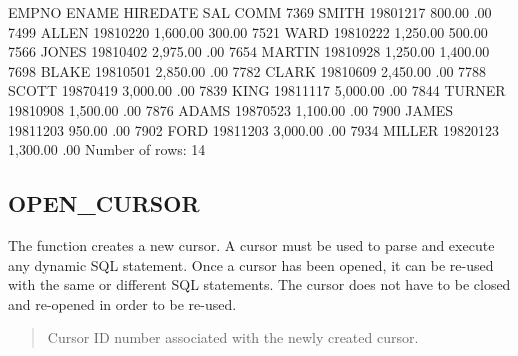 \documentclass[letterpaper,10pt,english,openany,oneside]{sphinxmanual}
\begin{document}
\begin{sphinxVerbatim}[commandchars=\\\{\}]
EMPNO  ENAME       HIREDATE    SAL       COMM
\PYGZhy{}\PYGZhy{}\PYGZhy{}\PYGZhy{}\PYGZhy{}  \PYGZhy{}\PYGZhy{}\PYGZhy{}\PYGZhy{}\PYGZhy{}\PYGZhy{}\PYGZhy{}\PYGZhy{}\PYGZhy{}\PYGZhy{}  \PYGZhy{}\PYGZhy{}\PYGZhy{}\PYGZhy{}\PYGZhy{}\PYGZhy{}\PYGZhy{}\PYGZhy{}\PYGZhy{}\PYGZhy{}  \PYGZhy{}\PYGZhy{}\PYGZhy{}\PYGZhy{}\PYGZhy{}\PYGZhy{}\PYGZhy{}\PYGZhy{}  \PYGZhy{}\PYGZhy{}\PYGZhy{}\PYGZhy{}\PYGZhy{}\PYGZhy{}\PYGZhy{}\PYGZhy{}
7369   SMITH       1980\PYGZhy{}12\PYGZhy{}17    800.00       .00
7499   ALLEN       1981\PYGZhy{}02\PYGZhy{}20  1,600.00    300.00
7521   WARD        1981\PYGZhy{}02\PYGZhy{}22  1,250.00    500.00
7566   JONES       1981\PYGZhy{}04\PYGZhy{}02  2,975.00       .00
7654   MARTIN      1981\PYGZhy{}09\PYGZhy{}28  1,250.00  1,400.00
7698   BLAKE       1981\PYGZhy{}05\PYGZhy{}01  2,850.00       .00
7782   CLARK       1981\PYGZhy{}06\PYGZhy{}09  2,450.00       .00
7788   SCOTT       1987\PYGZhy{}04\PYGZhy{}19  3,000.00       .00
7839   KING        1981\PYGZhy{}11\PYGZhy{}17  5,000.00       .00
7844   TURNER      1981\PYGZhy{}09\PYGZhy{}08  1,500.00       .00
7876   ADAMS       1987\PYGZhy{}05\PYGZhy{}23  1,100.00       .00
7900   JAMES       1981\PYGZhy{}12\PYGZhy{}03    950.00       .00
7902   FORD        1981\PYGZhy{}12\PYGZhy{}03  3,000.00       .00
7934   MILLER      1982\PYGZhy{}01\PYGZhy{}23  1,300.00       .00
Number of rows: 14
\end{sphinxVerbatim}

\newpage


\subsection{OPEN\_CURSOR}
\label{\detokenize{open_cursor::doc}}\label{\detokenize{open_cursor:open-cursor}}
The  function creates a new cursor. A cursor must be used to
parse and execute any dynamic SQL statement. Once a cursor has been
opened, it can be re-used with the same or different SQL statements. The
cursor does not have to be closed and re-opened in order to be re-used.
\begin{quote}

\end{quote}


\begin{quote}

Cursor ID number associated with the newly created cursor.
\end{quote}
\end{document}
